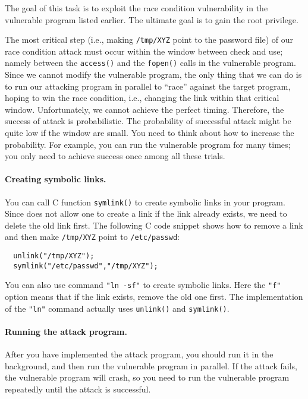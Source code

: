 The goal of this task is to exploit the race condition vulnerability in 
the vulnerable \setuid program listed earlier. The ultimate goal is to gain
the root privilege. 

The most critical step (i.e., making
\texttt{/tmp/XYZ} point to the password file) of our race condition attack must occur within
the window between check and use; namely between the \texttt{access()} 
and the \texttt{fopen()} calls in the vulnerable program.
Since we cannot modify the vulnerable program,
the only thing that we can do is to run our attacking program in parallel
to ``race'' against the target program, 
hoping to win the race condition, i.e., changing the link 
within that critical window.
Unfortunately, we cannot achieve the perfect timing. Therefore, 
the success of attack is probabilistic.
The probability of successful attack might be quite low if the window
are small. You need to think about how to increase the 
probability. For example,  you can run the vulnerable program for many
times; you only need to achieve success once among all these trials.



\paragraph{Creating symbolic links.}
You can call C function {\tt symlink()} to create symbolic links in your program.
Since \linux does not allow one to create a link if the link already exists,
we need to delete the old link first.
The following C code snippet shows how to remove a link and then make
{\tt /tmp/XYZ} point to {\tt /etc/passwd}:

\begin{lstlisting}
  unlink("/tmp/XYZ");
  symlink("/etc/passwd","/tmp/XYZ");
\end{lstlisting}

You can also use \linux command {\tt "ln -sf"} to create symbolic links.
Here the {\tt "f"} option means that if the link exists, remove the
old one first. The implementation of the
{\tt "ln"} command actually uses {\tt unlink()} and {\tt symlink()}.


\paragraph{Running the attack program.}
After you have implemented the attack program, you should run it 
in the background, and then run the vulnerable program 
in parallel. If the attack fails, the vulnerable program
will crash, so you need to run the vulnerable program repeatedly until the 
attack is successful. 




